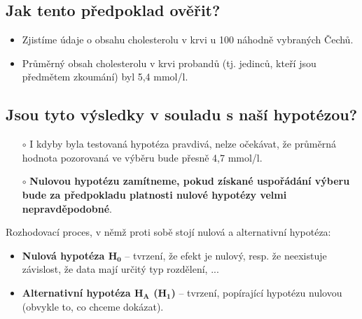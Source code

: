\subsection*{Jak tento předpoklad ověřit?}
\begin{itemize}
    \item Zjistíme údaje o obsahu cholesterolu v krvi u 100 náhodně vybraných Čechů.
    \item Průměrný obsah cholesterolu v krvi probandů (tj. jedinců, kteří jsou předmětem zkoumání) byl 5,4 mmol/l.
\end{itemize}
\subsection*{Jsou tyto výsledky v souladu s naší hypotézou?}
\begin{itemize}
    \item[$\circ$] I kdyby byla testovaná hypotéza pravdivá, nelze očekávat, že průměrná hodnota pozorovaná ve výběru bude přesně 4,7 mmol/l.
    \item[$\circ$] \textbf{Nulovou hypotézu zamítneme, pokud získané uspořádání výberu bude za předpokladu platnosti nulové hypotézy velmi nepravděpodobné}.
\end{itemize}
Rozhodovací proces, v němž proti sobě stojí nulová a alternativní hypotéza:
\begin{itemize}
    \item \textbf{Nulová hypotéza $\mathbf{H_0}$} -- tvrzení, že efekt je nulový, resp. že neexistuje závislost, že data mají určitý typ rozdělení, ...
    \item \textbf{Alternativní hypotéza $\mathbf{H_A}$ ($\mathbf{H_1}$)} -- tvrzení, popírající hypotézu nulovou (obvykle to, co chceme dokázat).
\end{itemize}

